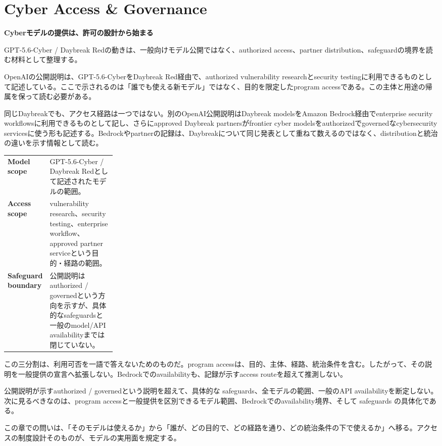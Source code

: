 \section{Cyber Access \& Governance}
\begin{wideflow}
{\Large\bfseries Cyberモデルの提供は、許可の設計から始まる}\par
\smallskip
{\color{SurveyMuted}GPT-5.6-Cyber / Daybreak Redの動きは、一般向けモデル公開ではなく、authorized access、partner distribution、safeguardの境界を読む材料として整理する。}\par
\end{wideflow}

OpenAIの公開説明は、GPT-5.6-CyberをDaybreak Red経由で、authorized vulnerability researchとsecurity testingに利用できるものとして記述している\cite{daybreak-defense}。ここで示されるのは「誰でも使える新モデル」ではなく、目的を限定したprogram accessである。この主体と用途の帰属を保って読む必要がある。

同じDaybreakでも、アクセス経路は一つではない。別のOpenAI公開説明はDaybreak modelsをAmazon Bedrock経由でenterprise security workflowsに利用できるものとして記し、さらにapproved Daybreak partnersがfrontier cyber modelsをauthorizedでgovernedなcybersecurity servicesに使う形も記述する\cite{daybreak-aws,daybreak-partners}。Bedrockやpartnerの記録は、Daybreakについて同じ発表として重ねて数えるのではなく、distributionと統治の違いを示す情報として読む。

\begin{themeoverview}[三つの範囲を分ける]
\begin{tabularx}{\linewidth}{@{}>{\bfseries}p{0.25\linewidth}X@{}}
Model scope & GPT-5.6-Cyber / Daybreak Redとして記述されたモデルの範囲。\\
Access scope & vulnerability research、security testing、enterprise workflow、approved partner serviceという目的・経路の範囲。\\
Safeguard boundary & 公開説明はauthorized / governedという方向を示すが、具体的なsafeguardsと一般のmodel/API availabilityまでは閉じていない。
\end{tabularx}
\end{themeoverview}

この三分割は、利用可否を一語で答えないためのものだ。program accessは、目的、主体、経路、統治条件を含む。したがって、その説明を一般提供の宣言へ拡張しない。Bedrockでのavailabilityも、記録が示すaccess routeを超えて推測しない。

\begin{claimboundary}[次に見るべき境界]
公開説明が示すauthorized / governedという説明を超えて、具体的な safeguards、全モデルの範囲、一般のAPI availabilityを断定しない。次に見るべきなのは、program accessと一般提供を区別できるモデル範囲、Bedrockでのavailability境界、そして safeguards の具体化である。
\end{claimboundary}

この章での問いは、「そのモデルは使えるか」から「誰が、どの目的で、どの経路を通り、どの統治条件の下で使えるか」へ移る。アクセスの制度設計そのものが、モデルの実用面を規定する。
